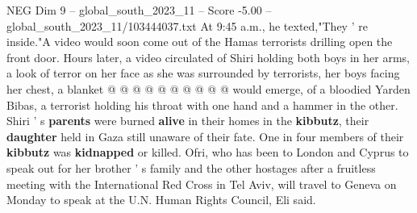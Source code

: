 \begin{textsample}{NEG Dim 9 – global\_south\_2023\_11 – Score -5.00 – global\_south\_2023\_11/103444037.txt}
At 9:45 a.m., he texted,"They ' re inside."A video would soon come out of the Hamas terrorists drilling open the front door.
Hours later, a video circulated of Shiri holding both boys in her arms, a look of terror on her face as she was surrounded by terrorists, her boys facing her chest, a blanket @ @ @ @ @ @ @ @ @ @ would emerge, of a bloodied Yarden Bibas, a terrorist holding his throat with one hand and a hammer in the other.
Shiri ' s \textbf{parents} were burned \textbf{alive} in their homes in the \textbf{kibbutz}, their \textbf{daughter} held in Gaza still unaware of their fate.
One in four members of their \textbf{kibbutz} was \textbf{kidnapped} or killed.
Ofri, who has been to London and Cyprus to speak out for her brother ' s family and the other hostages after a fruitless meeting with the International Red Cross in Tel Aviv, will travel to Geneva on Monday to speak at the U.N.
Human Rights Council, Eli said.

\end{textsample}
